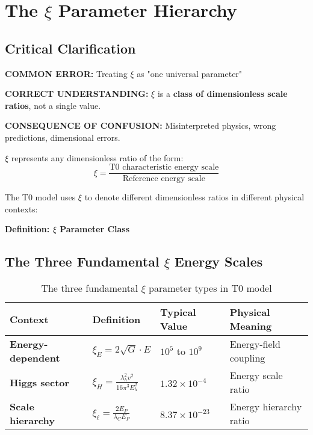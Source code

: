 \documentclass[12pt,a4paper]{article}
\begin{document}
	\section{The $\xi$ Parameter Hierarchy}
	
	\subsection{Critical Clarification}
	
	\begin{tcolorbox}[colback=red!10!white,colframe=red!75!black,title=CRITICAL WARNING: $\xi$ Parameter Confusion]
		\textbf{COMMON ERROR:} Treating $\xi$ as "one universal parameter"
		
		\textbf{CORRECT UNDERSTANDING:} $\xi$ is a \textbf{class of dimensionless scale ratios}, not a single value.
		
		\textbf{CONSEQUENCE OF CONFUSION:} Misinterpreted physics, wrong predictions, dimensional errors.
		
			$\xi$ represents any dimensionless ratio of the form:
		\begin{equation}
			\xi = \frac{\text{T0 characteristic energy scale}}{\text{Reference energy scale}}
		\end{equation}

	
	The T0 model uses $\xi$ to denote different dimensionless ratios in different physical contexts:
	
	\textbf{Definition: $\xi$ Parameter Class}
	\end{tcolorbox}	
	
	
	\subsection{The Three Fundamental $\xi$ Energy Scales}
	
	\begin{table}[htbp]
		\centering
		\begin{tabular}{|p{3cm}|p{4cm}|p{3cm}|p{4cm}|}
			\hline
			\textbf{Context} & \textbf{Definition} & \textbf{Typical Value} & \textbf{Physical Meaning} \\
			\hline
			\textbf{Energy-dependent} & $\xi_E = 2\sqrt{G} \cdot E$ & $10^5$ to $10^9$ & Energy-field coupling \\
			\hline
			\textbf{Higgs sector} & $\xi_H = \frac{\lambda_h^2 v^2}{16\pi^3 E_h^2}$ & $1.32 \times 10^{-4}$ & Energy scale ratio \\
			\hline
			\textbf{Scale hierarchy} & $\xi_\ell = \frac{2E_P}{\lambda_C E_P}$ & $8.37 \times 10^{-23}$ & Energy hierarchy ratio \\
			\hline
		\end{tabular}
		\caption{The three fundamental $\xi$ parameter types in T0 model}
		\label{tab:xi_hierarchy}
	\end{table}
	
\end{document}
